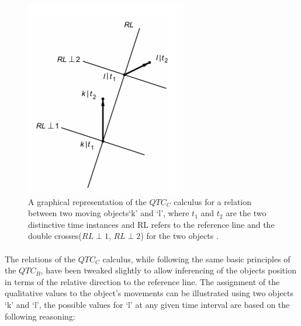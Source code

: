 	\newpage
	
	\begin{figure}[h!]
		\centering
		\includegraphics[scale=1]{images/QTCC}
		\caption{A graphical representation of the $QTC_C$ calculus for a relation between two moving objects`k' and `l', where $t_1$ and $t_2$ are the two distinctive time instances and RL refers to the reference line and the double crosses($RL\perp1$, $RL\perp2$) for the two objects \cite{van2005qualitative} .}
		\label{fig:qtcc}
	\end{figure}

	\paragraph{}The relations of the $QTC_C$ calculus, while following the same basic principles of the $QTC_B$, have been tweaked slightly to allow inferencing of the objects position in terms of the relative direction to the reference line. The assignment of the qualitative values to the object's movements can be illustrated using two objects `k' and `l', the possible values for `l' at any given time interval are based on the following reasoning:
	
